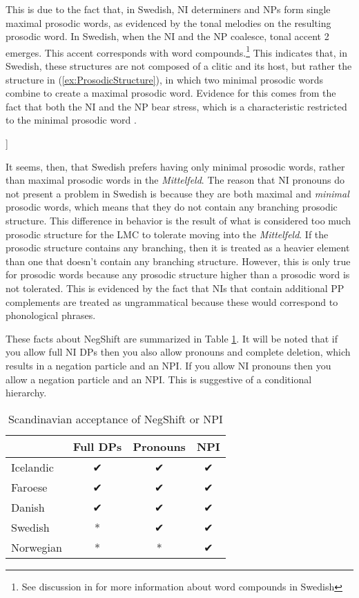 \documentclass[12pt, letterpaper]{article}
\begin{document}
This is due to the fact that, in Swedish, NI determiners and NPs form single maximal prosodic words, as evidenced by the tonal melodies on the resulting prosodic word. In Swedish, when the NI and the NP coalesce, tonal accent 2 emerges. This accent corresponds with word compounds.\footnote{See discussion in \cite{myrbergProsodicWordSwedish2013,myrbergProsodicHierarchySwedish2015} for more information about word compounds in Swedish} This indicates that, in Swedish, these structures are not composed of a clitic and its host, but rather the structure in (\ref{ex:ProsodicStructure}), in which two minimal prosodic words combine to create a maximal prosodic word. Evidence for this comes from the fact that both the NI and the NP bear stress, which is a characteristic restricted to the minimal prosodic word \citep{myrbergProsodicWordSwedish2013,myrbergProsodicHierarchySwedish2015}. 
\ea \label{ex:ProsodicStructure}
\begin{forest}
	[$\omega_{max}$
		[$\omega_{min}$\\\emph{inga}] [$\omega_{min}$\\\emph{grottor}]
	]
\end{forest} 
\z 
It seems, then, that Swedish prefers having only minimal prosodic words, rather than maximal prosodic words in the \emph{Mittelfeld}. The reason that NI pronouns do not present a problem in Swedish is because they are both maximal and \emph{minimal} prosodic words, which means that they do not contain any branching prosodic structure. This difference in behavior is the result of what is considered too much prosodic structure for the LMC to tolerate moving into the \emph{Mittelfeld}. If the prosodic structure contains any branching, then it is treated as a heavier element than one that doesn't contain any branching structure. However, this is only true for prosodic words because any prosodic structure higher than a prosodic word is not tolerated. This is evidenced by the fact that NIs that contain additional PP complements are treated as ungrammatical because these would correspond to phonological phrases. 

These facts about NegShift are summarized in Table \ref{tab:Paradigm}. It will be noted that if you allow full NI DPs then you also allow pronouns and complete deletion, which results in a negation particle and an NPI. If you allow NI pronouns then you allow a negation particle and an NPI. This is suggestive of a conditional hierarchy. 

\begin{table}[!ht]
	\centering
	\caption{Scandinavian acceptance of NegShift or NPI}
	\label{tab:Paradigm}
\begin{tabular}{lccc}
	\hline 
	& Full DPs & Pronouns & NPI\\
	\hline
	Icelandic & ✔︎ & ✔︎ & ✔︎ \\
	Faroese & ✔︎ & ✔︎ & ✔︎ \\
	Danish & ✔︎ & ✔︎ & ✔︎ \\
	Swedish & * & ✔︎ & ✔︎ \\
	Norwegian & * & * & ✔︎ \\
	\hline 
\end{tabular} 
\end{table}
\end{document}
